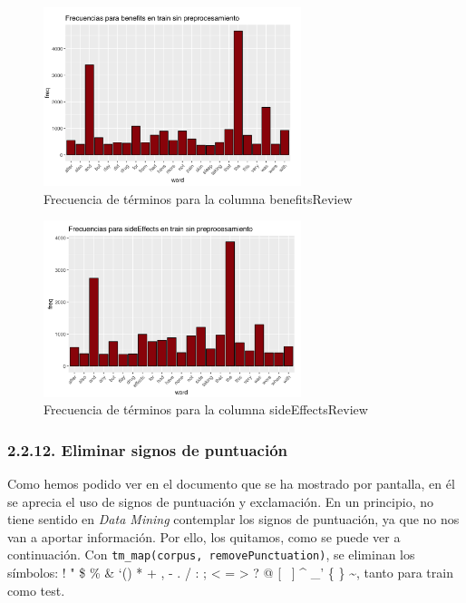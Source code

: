\documentclass[spanish,]{article}
\begin{document}
\begin{figure}[ht]
    \centering
    \includegraphics[width=0.67\textwidth]{imagenes/frecuencias_benefits.png}
    \caption{Frecuencia de términos para la columna benefitsReview}
    \label{benefits3}
\end{figure}

\begin{figure}[ht]
    \centering
    \includegraphics[width=0.67\textwidth]{imagenes/frecuencias_sideEffects.png}
    \caption{Frecuencia de términos para la columna sideEffectsReview}
    \label{benefits4}
\end{figure}

\subsubsection{2.2.12. Eliminar signos de
puntuación}\label{eliminar-signos-de-puntuacion}

Como hemos podido ver en el documento que se ha mostrado por pantalla,
en él se aprecia el uso de signos de puntuación y exclamación. En un
principio, no tiene sentido en \textit{Data Mining} contemplar los
signos de puntuación, ya que no nos van a aportar información. Por ello,
los quitamos, como se puede ver a continuación. Con
\texttt{tm\_map(corpus,\ removePunctuation)}, se eliminan los símbolos:
! " \$ \% \& `() * + , - . / : ; \textless{} = \textgreater{} ? @ {[}
~{]} \^{} \_' \{ \textbar{} \} \textasciitilde{}, tanto para train como
test.
\end{document}
